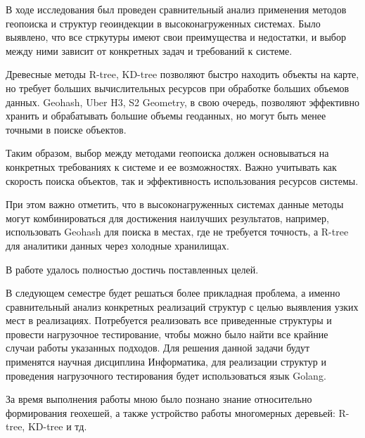 \Conclusion

В ходе исследования был проведен сравнительный анализ применения методов геопоиска и структур геоиндекции в высоконагруженных системах. Было выявлено, что все стркутуры имеют свои преимущества и недостатки, и выбор между ними зависит от конкретных задач и требований к системе.

Древесные методы R-tree, KD-tree позволяют быстро находить объекты на карте, но требует больших вычислительных ресурсов при обработке больших объемов данных. Geohash, Uber H3, S2 Geometry, в свою очередь, позволяют эффективно хранить и обрабатывать большие объемы геоданных, но могут быть менее точными в поиске объектов.

Таким образом, выбор между методами геопоиска должен основываться на конкретных требованиях к системе и ее возможностях. Важно учитывать как скорость поиска объектов, так и эффективность использования ресурсов системы.

При этом важно отметить, что в высоконагруженных системах данные методы могут комбинироваться для достижения наилучших результатов, например, использовать Geohash для поиска в местах, где не требуется точность, а R-tree для аналитики данных через холодные хранилищах.

В работе удалось полностью достичь поставленных целей.

В следующем семестре будет решаться более прикладная проблема, а именно сравнительный анализ конкретных реализаций структур с целью выявления узких мест в реализациях. Потребуется реализовать все приведенные структуры и провести нагрузочное тестирование, чтобы можно было найти все крайние случаи работы указанных подходов. Для решения данной задачи будут применятся научная дисциплина Информатика, для реализации структур и проведения нагрузочного тестирования будет использоваться язык Golang.

За время выполнения работы мною было познано знание относительно формирования геохешей, а также устройство работы многомерных деревьей: R-tree, KD-tree и тд.
